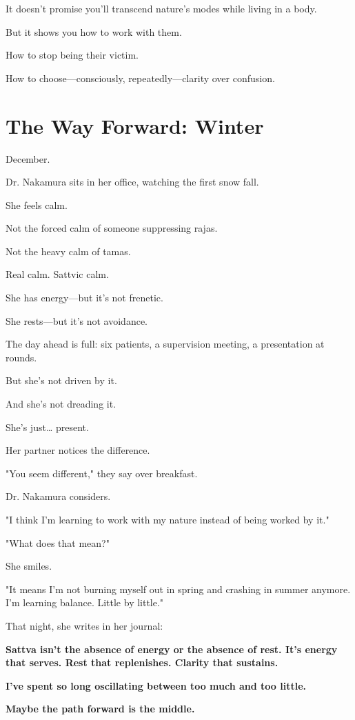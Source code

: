\documentclass[11pt,twoside]{book}
\begin{document}
It doesn't promise you'll transcend nature's modes while living in a body.

But it shows you how to work with them.

How to stop being their victim.

How to choose—consciously, repeatedly—clarity over confusion.

\section*{The Way Forward: Winter}

December.

Dr. Nakamura sits in her office, watching the first snow fall.

She feels calm.

Not the forced calm of someone suppressing rajas.

Not the heavy calm of tamas.

Real calm. Sattvic calm.

She has energy—but it's not frenetic.

She rests—but it's not avoidance.

The day ahead is full: six patients, a supervision meeting, a presentation at rounds.

But she's not driven by it.

And she's not dreading it.

She's just\ldots{} present.

Her partner notices the difference.

"You seem different," they say over breakfast.

Dr. Nakamura considers.

"I think I'm learning to work with my nature instead of being worked by it."

"What does that mean?"

She smiles.

"It means I'm not burning myself out in spring and crashing in summer anymore. I'm learning balance. Little by little."

That night, she writes in her journal:

\textbf{Sattva isn't the absence of energy or the absence of rest. It's energy that serves. Rest that replenishes. Clarity that sustains.}

\textbf{I've spent so long oscillating between too much and too little.}

\textbf{Maybe the path forward is the middle.}
\end{document}
